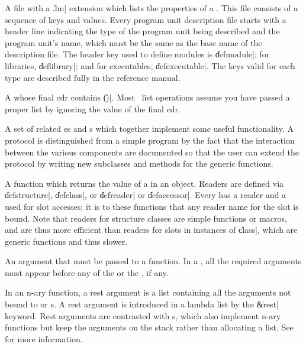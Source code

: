\begin{description}
	{A file with a \|.lm| extension which lists the properties of
	a .  This file consists of a sequence of
	keys and values.  Every program unit description file starts
	with a header line indicating the type of the program unit
	being described and the program unit's name, which must be the
	same as the base name of the description file.  The header key
	used to define modules is \|defmodule|; for libraries,
	\|deflibrary|; and for executables, \|defexecutable|.  The
	keys valid for each type are described fully in the reference
	manual.}

	{A  whose final cdr contains \|()|.  Most \Talk\
	list operations assume you have passed a proper list by
	ignoring the value of the final cdr.}

	{A set of related es and s
	which together implement some useful functionality.  A
	protocol is distinguished from a simple program by the fact
	that the interaction between the various components are
	documented so that the user can extend the protocol by writing
	new subclasses and methods for the generic functions.}

	{A function which returns the value of a  in an
	object.  Readers are defined via \|defstructure|, \|defclass|,
	or \|defreader| or \|defaccessor|.  Every  has a reader and a  used for slot
	accesses; it is to these functions that any reader name for
	the slot is bound.  Note that readers for structure classes
	are simple functions or macros, and are thus more efficient
	than readers for slots in instances of \|class|, which are
	generic functions and thus slower.}

	{An argument that must be passed to a function.  In a
	, all the required arguments must appear
	before any of the  or the
	, if any.}

	{In an n-ary function, a rest argument is a list containing
	all the arguments not bound to  or
	s.  A rest argument is introduced in a
	lambda list by the \|\&rest| keyword.  Rest arguments are
	contrasted with s, which also
	implement n-ary functions but keep the arguments on the stack
	rather than allocating a list.  See 
	for more information.}


\end{description}
